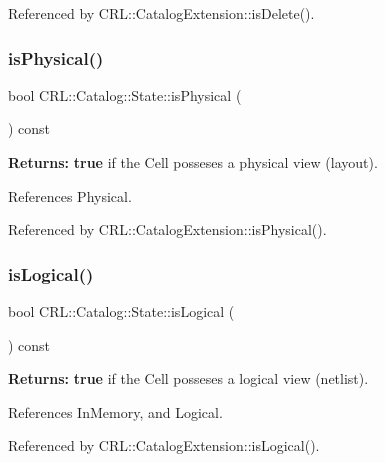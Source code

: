 Referenced by C\+R\+L\+::\+Catalog\+Extension\+::is\+Delete().

\mbox{\label{classCRL_1_1Catalog_1_1State_a72b60d86f25221fd8fe7a5902be528a2}} 
\subsubsection{\texorpdfstring{is\+Physical()}{isPhysical()}}
{\footnotesize\ttfamily bool C\+R\+L\+::\+Catalog\+::\+State\+::is\+Physical (\begin{DoxyParamCaption}{ }\end{DoxyParamCaption}) const\hspace{0.3cm}{\ttfamily [inline]}}

{\bfseries Returns\+:} {\bfseries true} if the Cell posseses a physical view (layout). 

References Physical.



Referenced by C\+R\+L\+::\+Catalog\+Extension\+::is\+Physical().

\mbox{\label{classCRL_1_1Catalog_1_1State_a07aad28830a57090cf9203b0ff8714b1}} 
\subsubsection{\texorpdfstring{is\+Logical()}{isLogical()}}
{\footnotesize\ttfamily bool C\+R\+L\+::\+Catalog\+::\+State\+::is\+Logical (\begin{DoxyParamCaption}{ }\end{DoxyParamCaption}) const\hspace{0.3cm}{\ttfamily [inline]}}

{\bfseries Returns\+:} {\bfseries true} if the Cell posseses a logical view (netlist). 

References In\+Memory, and Logical.



Referenced by C\+R\+L\+::\+Catalog\+Extension\+::is\+Logical().

